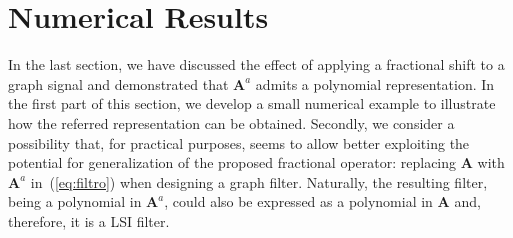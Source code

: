 \section{Numerical Results}\label{sec:num}
In the last section, we have discussed the effect of applying a fractional shift to a graph signal and demonstrated that $\mathbf{A}^a$ admits a polynomial representation. In the first part of this section, we develop a small numerical example to illustrate how the referred representation can be obtained. Secondly, we consider a possibility that, for practical purposes, seems to allow better exploiting the potential for generalization of the proposed fractional operator: replacing $\mathbf{A}$ with $\mathbf{A}^a$ in~(\ref{eq:filtro}) when designing a graph filter. Naturally, the resulting filter, being a polynomial in $\mathbf{A}^a$, could also be expressed as a polynomial in $\mathbf{A}$ and, therefore, it is a LSI filter.

